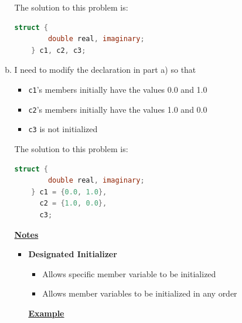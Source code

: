 \documentclass[12pt]{article}
\begin{document}
\begin{enumerate}[1.]
\begin{enumerate}[a)]
        \bigskip

        The solution to this problem is:

        \bigskip

\begin{lstlisting}[language=c]
    struct {
        double real, imaginary;
    } c1, c2, c3;
\end{lstlisting}

        \item

        I need to modify the declaration in part a) so that

        \begin{itemize}
            \item \texttt{c1}'s members initially have the values 0.0 and 1.0
            \item \texttt{c2}'s members initially have the values 1.0 and 0.0
            \item \texttt{c3} is not initialized
        \end{itemize}

        \bigskip

        The solution to this problem is:

        \bigskip

\begin{lstlisting}[language=c]
    struct {
        double real, imaginary;
    } c1 = {0.0, 1.0},
      c2 = {1.0, 0.0},
      c3;
\end{lstlisting}

        \bigskip

        \underline{\textbf{Notes}}

        \begin{itemize}
            \item \textbf{Designated Initializer}

            \begin{itemize}
                \item Allows specific member variable to be initialized
                \item Allows member variables to be initialized in any order
            \end{itemize}

            \bigskip

            \underline{\textbf{Example}}

            \bigskip


\end{itemize}
\end{enumerate}
\end{enumerate}
\end{document}
